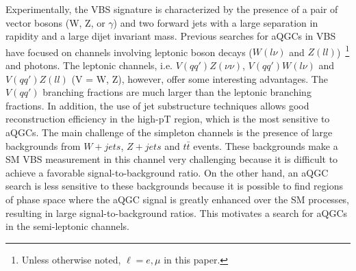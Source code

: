 Experimentally, the VBS signature is characterized by the presence of a pair of vector bosons (W, Z, or $\gamma$) and two forward jets with a large separation in rapidity and a large dijet invariant mass. Previous searches for aQGCs in VBS have focused on channels involving leptonic boson decays ($W(l\nu)$ and $Z(ll)$)~\footnote{Unless otherwise noted, $\ell=e,\mu$ in this paper.} and photons.
The leptonic channels, i.e. $V(qq')Z(\nu\nu)$, $V(qq')W(l\nu)$ and $V(qq')Z(ll)$ (V = W, Z), however, offer some interesting advantages. The $V(qq')$ branching fractions are much larger than the leptonic branching fractions. In addition, the use of jet substructure techniques allows good reconstruction efficiency in the high-pT region, which is the most sensitive to aQGCs.
The main challenge of the simpleton channels is the presence of large backgrounds from $W + jets$, $Z + jets$ and $t\bar{t}$ events. These backgrounds make a SM VBS measurement in this channel very challenging because it is difficult to achieve a favorable signal-to-background ratio. On the other hand, an aQGC search is less sensitive to these backgrounds because it is possible to find regions of phase space where the aQGC signal is greatly enhanced over the SM processes, resulting in large signal-to-background ratios. This motivates a search for aQGCs in the semi-leptonic channels.

